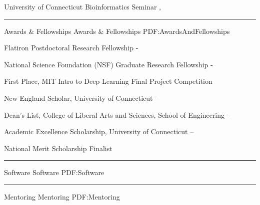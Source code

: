 \documentclass[letterpaper,MMMyyyy,nonstopmode]{simpleresumecv}
\begin{document}
\begin{Body}
\Entry
{University of Connecticut Bioinformatics Seminar}
\hfill
{}, 

\BigGap
\hrule
\Section
{Awards \&\newline
Fellowships}
{Awards \& Fellowships}
{PDF:AwardsAndFellowships}

\Entry
{Flatiron Postdoctoral Research Fellowship}
\hfill
{} - 
\Gap

\Entry
{National Science Foundation (NSF) Graduate Research Fellowship}
\hfill
{} - 
\Gap

\Entry
{First Place, MIT Intro to Deep Learning Final Project Competition}
\hfill
{}
\Gap

\Entry
{New England Scholar, University of Connecticut}
\hfill
{} -- 
\Gap

\Entry
{Dean's List, College of Liberal Arts and Sciences, School of Engineering}
\hfill
{} --
\Gap

\Entry
{Academic Excellence Scholarship, University of Connecticut}
\hfill
{} -- 
\Gap




\Entry
{National Merit Scholarship Finalist}
\hfill
{}

\BigGap
\hrule
\Section
{Software}
{Software}
{PDF:Software}


\BigGap
\hrule
\Section
{Mentoring}
{Mentoring}
{PDF:Mentoring}


\end{Body}
\end{document}

